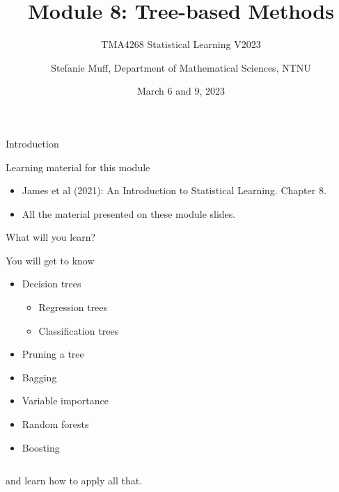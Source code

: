 \documentclass[
  10pt,
  ignorenonframetext,
]{beamer}
\title{Module 8: Tree-based Methods}
\subtitle{TMA4268 Statistical Learning V2023}
\author{Stefanie Muff, Department of Mathematical Sciences, NTNU}
\date{March 6 and 9, 2023}
\providecommand{\tightlist}{%
  \setlength{\itemsep}{0pt}\setlength{\parskip}{0pt}}
\begin{document}
\frame{\titlepage}

\begin{frame}{Introduction}
\protect\hypertarget{introduction}{}
\begin{block}{Learning material for this module}
\protect\hypertarget{learning-material-for-this-module}{}
\vspace{2mm}

\begin{itemize}
\tightlist
\item
  James et al (2021): An Introduction to Statistical Learning. Chapter
  8.\\
\item
  All the material presented on these module slides.
\end{itemize}
\end{block}
\end{frame}

\begin{frame}
\begin{block}{What will you learn?}
\protect\hypertarget{what-will-you-learn}{}
\vspace{2mm}

You will get to know

\begin{itemize}
\tightlist
\item
  Decision trees

  \begin{itemize}
  \tightlist
  \item
    Regression trees\\
  \item
    Classification trees\\
  \end{itemize}
\item
  Pruning a tree
\item
  Bagging
\item
  Variable importance
\item
  Random forests
\item
  Boosting
\end{itemize}

\(~\)

and learn how to apply all that.
\end{block}
\end{frame}
\end{document}
